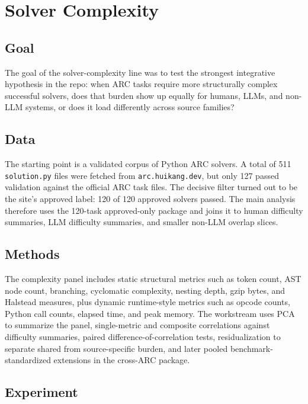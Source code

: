 \section{Solver Complexity}

\subsection{Goal}

The goal of the solver-complexity line was to test the strongest integrative hypothesis in the repo: when ARC tasks require more structurally complex successful solvers, does that burden show up equally for humans, LLMs, and non-LLM systems, or does it load differently across source families?

\subsection{Data}

The starting point is a validated corpus of Python ARC solvers. A total of 511 \texttt{solution.py} files were fetched from \texttt{arc.huikang.dev}, but only 127 passed validation against the official ARC task files. The decisive filter turned out to be the site's approved label: 120 of 120 approved solvers passed. The main analysis therefore uses the 120-task approved-only package and joins it to human difficulty summaries, LLM difficulty summaries, and smaller non-LLM overlap slices.

\subsection{Methods}

The complexity panel includes static structural metrics such as token count, AST node count, branching, cyclomatic complexity, nesting depth, gzip bytes, and Halstead measures, plus dynamic runtime-style metrics such as opcode counts, Python call counts, elapsed time, and peak memory. The workstream uses PCA to summarize the panel, single-metric and composite correlations against difficulty summaries, paired difference-of-correlation tests, residualization to separate shared from source-specific burden, and later pooled benchmark-standardized extensions in the cross-ARC package.

\subsection{Experiment}

